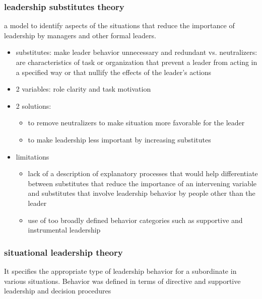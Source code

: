 \subsubsection{leadership substitutes theory} %
\label{ssub:leadership_substitutes_theory}
a model to identify aspects of the situations that reduce the importance of leadership by managers and other
formal leaders.
\begin{itemize}
	\item substitutes: make leader behavior unnecessary and redundant vs. neutralizers: are characteristics of task or organization that prevent a leader from acting in a specified way or that nullify the effects of the leader’s actions
	\item 2 variables: role clarity and task motivation
	\item 2 solutions:
	\begin{itemize}
		\item to remove neutralizers to make situation more favorable for the leader
		\item to make leadership less important by increasing substitutes
	\end{itemize}
	\item limitations
	\begin{itemize}
		\item lack of a description of explanatory processes that would help differentiate between substitutes that reduce the importance of an intervening variable and substitutes that involve leadership behavior by people other than the leader
		\item use of too broadly defined behavior categories such as supportive and instrumental leadership

	\end{itemize}
\end{itemize}


\subsubsection{situational leadership theory} %
\label{ssub:situational_leadership_theory}
	It specifies the appropriate type of leadership behavior for a subordinate in various situations. Behavior was defined in terms of directive and supportive leadership and decision procedures

